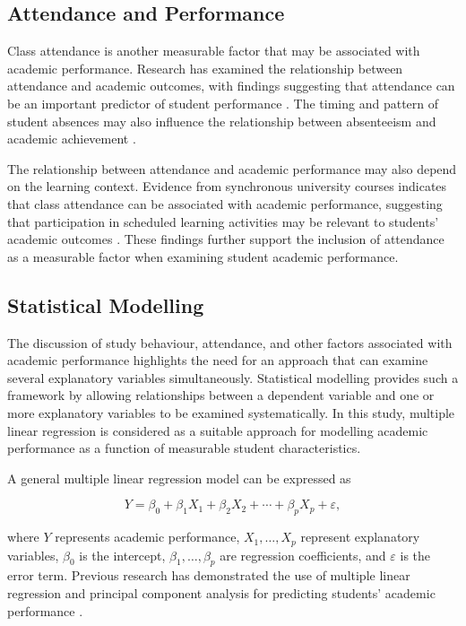 \subsection{Attendance and Performance}

Class attendance is another measurable factor that may be associated with academic performance. Research has examined the relationship between attendance and academic outcomes, with findings suggesting that attendance can be an important predictor of student performance \citep{arnold2018attendance}. The timing and pattern of student absences may also influence the relationship between absenteeism and academic achievement \citep{keppens2023absence}.

The relationship between attendance and academic performance may also depend on the learning context. Evidence from synchronous university courses indicates that class attendance can be associated with academic performance, suggesting that participation in scheduled learning activities may be relevant to students' academic outcomes \citep{ha2024attendance}. These findings further support the inclusion of attendance as a measurable factor when examining student academic performance.

\subsection{Statistical Modelling}

The discussion of study behaviour, attendance, and other factors associated with academic performance highlights the need for an approach that can examine several explanatory variables simultaneously. Statistical modelling provides such a framework by allowing relationships between a dependent variable and one or more explanatory variables to be examined systematically. In this study, multiple linear regression is considered as a suitable approach for modelling academic performance as a function of measurable student characteristics.

\vspace{0.5em}

\noindent A general multiple linear regression model can be expressed as

\[
Y = \beta_0 + \beta_1X_1 + \beta_2X_2 + \cdots + \beta_pX_p + \varepsilon,
\]

where \(Y\) represents academic performance, \(X_1,\ldots,X_p\) represent explanatory variables, \(\beta_0\) is the intercept, \(\beta_1,\ldots,\beta_p\) are regression coefficients, and \(\varepsilon\) is the error term. Previous research has demonstrated the use of multiple linear regression and principal component analysis for predicting students' academic performance \citep{yang2018predicting}.